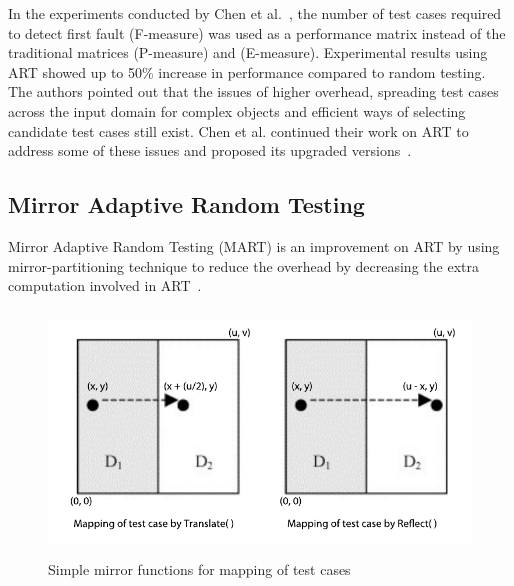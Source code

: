 In the experiments conducted by Chen et al.~\cite{chen2005adaptive}, the number of test cases required to detect first fault (F-measure) was used as a performance matrix instead of the traditional matrices (P-measure) and (E-measure). Experimental results using ART showed up to 50\% increase in performance compared to random testing. The authors pointed out that the issues of higher overhead, spreading test cases across the input domain for complex objects and efficient ways of selecting candidate test cases still exist. Chen et al. continued their work on ART to address some of these issues and proposed its upgraded versions~\cite{chen2009enhanced}. 

\subsection{Mirror Adaptive Random Testing}
Mirror Adaptive Random Testing (MART) is an improvement on ART by using mirror-partitioning technique to reduce the overhead by decreasing the extra computation involved in ART~\cite{chen2004mirror}. 

\begin{figure}[h]
\begin{center}
	\includegraphics[width=13.5cm, height=6.5cm ]{chapter2/mart2.pdf}
	\caption{Simple mirror functions for mapping of test cases~\cite{chen2004mirror}}
\label{fig:mirrorART}
\end{center}  
\end{figure}

